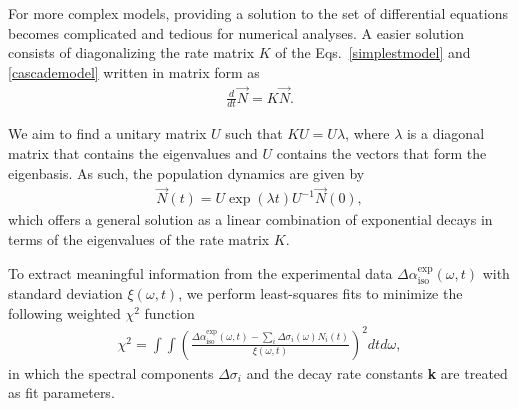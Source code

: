 For more complex models, providing a solution to the set of differential equations becomes complicated and tedious for numerical analyses. A easier solution consists of diagonalizing the rate matrix $K$ of the Eqs.\ \ref{simplestmodel} and \ref{cascademodel} written in matrix form as
\begin{eqnarray}
\frac{d}{d t} \vec{N} = K \vec{N}.
\label{differentialK}
\end{eqnarray}

We aim to find a unitary matrix $U$ such that $K U = U \lambda$,
where $\lambda$ is a diagonal matrix that contains the eigenvalues and $U$ contains the vectors that form the eigenbasis. %
As such, the population dynamics are given by
\begin{eqnarray}
\vec{N} (t) = U \exp(\lambda t) U^{-1} \vec{N} (0),
\label{PopuEigen}
\end{eqnarray}
which offers a general solution as a linear combination of exponential decays in terms of the eigenvalues of the rate matrix $K$.



To extract meaningful information from the experimental data $\Delta\alpha_\text{iso}^\text{exp} (\omega,t)$ with standard deviation $\xi (\omega, t)$, we perform least-squares fits to minimize the following weighted $\chi^2$ function
\begin{eqnarray}
\chi^2 = \int \int \left( \frac{\Delta \alpha_\text{iso}^\text{exp} (\omega,t) - \sum_i \Delta\sigma_i(\omega)N_i(t)}{\xi (\omega, t)}\right)^2 dt d\omega,
\label{ChiSquare}
\end{eqnarray}
in which the spectral components $\Delta\sigma_i$ and the decay rate constants \textbf{k} are treated as fit parameters.


